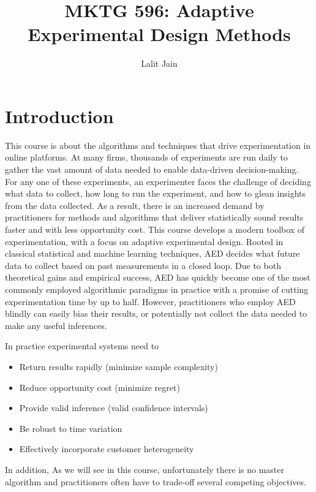 \documentclass[11pt]{article}
\title{MKTG 596: Adaptive Experimental Design Methods}
\author{Lalit Jain}
\newcommand{\1}[1]{\mathbf{1}\left\{#1\right\}}
\begin{document}
\maketitle

\section{Introduction}

This course is about the algorithms and techniques that drive experimentation in online platforms. At many firms, thousands of experiments are run daily to gather the vast amount of data needed to enable data-driven decision-making. For any one of these experiments, an experimenter faces the challenge of deciding what data to collect, how long to run the experiment, and how to glean insights from the data collected. As a result, there is an increased demand by practitioners for methods and algorithms that deliver statistically sound results faster and with less opportunity cost. This course develops a modern toolbox of experimentation, with a focus on adaptive experimental design. Rooted in classical statistical and machine learning techniques, AED decides what future data to collect based on past measurements in a closed loop. Due to both theoretical gains and empirical success, AED has quickly become one of the most commonly employed algorithmic paradigms in practice with a promise of cutting experimentation time by up to half. However, practitioners who employ AED blindly can easily bias their results, or potentially not collect the data needed to make any useful inferences.  

In practice experimental systems need to 
\begin{itemize}
    \item Return results rapidly (minimize sample complexity)
    \item Reduce opportunity cost (minimize regret)
    \item Provide valid inference (valid confidence intervals)
    \item Be robust to time variation
    \item Effectively incorporate customer heterogeneity
\end{itemize}
In addition, 
As we will see in this course, unfortunately there is no master algorithm and practitioners often have to trade-off several competing objectives. 
\end{document}
